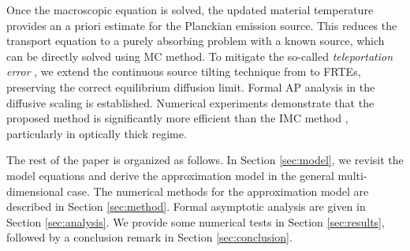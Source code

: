 \documentclass[preprint,12pt]{elsarticle}
\theoremstyle{definition}
\theoremstyle{plain}
\numberwithin{equation}{section}
\numberwithin{algorithm}{section}
\newcounter{eq_count}
\newcounter{tab_count}
\begin{document}
 Once the macroscopic equation is solved, the updated material temperature provides an a priori estimate for the Planckian emission source. This reduces the transport equation to a purely absorbing problem with a known source, which can be directly solved using MC method. To mitigate the so-called \textit{teleportation error} \cite{fleck1984random}, we extend the continuous source tilting technique from \cite{shi2020continuous} to FRTEs, preserving the correct equilibrium diffusion limit. Formal AP analysis in the diffusive scaling is established.
 Numerical experiments demonstrate that the proposed method is significantly more efficient than the IMC method \cite{fleck1971implicit}, particularly in optically thick regime.

The rest of the paper is organized as follows. In Section \ref{sec:model}, we revisit the model equations and derive the approximation model in the general multi-dimensional case. The numerical methods for the approximation model are described in Section \ref{sec:method}. Formal asymptotic analysis are given in Section \ref{sec:analysis}. We provide some numerical tests in Section \ref{sec:results}, followed by a conclusion remark in Section \ref{sec:conclusion}.
\end{document}
